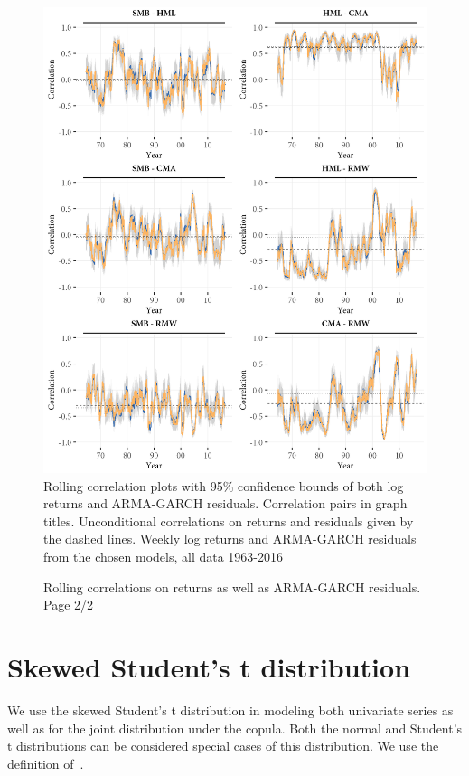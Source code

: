 \begin{figure}[H]
  \caption{Rolling correlations on returns as well as ARMA-GARCH residuals. Page 2/2}
  \label{fig:appendix_rolling2}
  \centering
  \begin{minipage}{\textwidth}
  \includegraphics[scale=1]{graphics/appendix_rolling2.png}  
  \vspace{3mm}
  \footnotesize
  Rolling correlation plots with 95\% confidence bounds of both log returns and ARMA-GARCH residuals. Correlation pairs in graph titles. Unconditional correlations on returns and residuals given by the dashed lines. Weekly log returns and ARMA-GARCH residuals from the chosen models, all data 1963-2016
  \end{minipage}
\end{figure}

\newpage

\section{Skewed Student's t distribution} 
\label{app:ghstmv}
We use the skewed Student's t distribution in modeling both univariate series as well as for the joint distribution under the copula. Both the normal and Student's t distributions can be considered special cases of this distribution. We use the definition of~\textcite{Hansen1994}.


